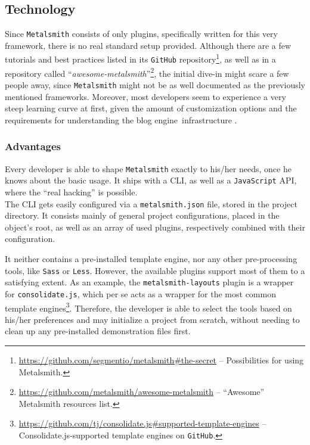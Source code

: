 \subsection{Technology}
\label{sec:metalsmith-technology}
Since \texttt{Metalsmith} consists of only plugins, specifically written for this very framework, there is no real standard setup provided. Although there are a few tutorials and best practices listed in its \texttt{GitHub} repository\footnote{\url{https://github.com/segmentio/metalsmith\#the-secret} -- Possibilities for using Metalsmith.}, as well as in a repository called ``\emph{awesome-metalsmith}''\footnote{\url{https://github.com/metalsmith/awesome-metalsmith} -- ``Awesome'' Metalsmith resources list.}, the initial dive-in might scare a few people away, since \texttt{Metalsmith} might not be as well documented as the previously mentioned frameworks. Moreover, most developers seem to experience a very steep learning curve at first, given the amount of customization options and the requirements for understanding the blog engine~infrastructure \cite[31]{dhillon2016}.

\subsubsection{Advantages}
Every developer is able to shape \texttt{Metalsmith} exactly to his/her needs, once he knows about the basic usage. It ships with a CLI, as well as a \texttt{JavaScript} API, where the ``real hacking'' is possible.\\
The CLI gets easily configured via a \texttt{metalsmith.json} file, stored in the project directory. It consists mainly of general project configurations, placed in the object's root, as well as an array of used plugins, respectively combined with their configuration.

It neither contains a pre-installed template engine, nor any other pre-processing tools, like \texttt{Sass} or \texttt{Less}. However, the available plugins support most of them to a satisfying extent. As an example, the \texttt{metalsmith-layouts} plugin is a wrapper for \texttt{consolidate.js}, which per se acts as a wrapper for the most common template engines\footnote{\url{https://github.com/tj/consolidate.js\#supported-template-engines} -- Consolidate.js-supported template engines on \texttt{GitHub}.}. Therefore, the developer is able to select the tools based on his/her preferences and may initialize a project from scratch, without needing to clean up any pre-installed demonstration files first.

